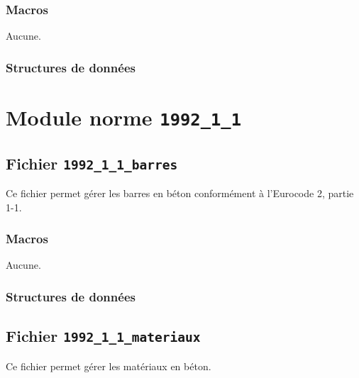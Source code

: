 \documentclass{article}
\begin{document}
\subsubsection{Macros}
Aucune.
\subsubsection{Structures de données}











\section{Module norme {\texttt{1992\_1\_1}}}
\subsection{Fichier {\texttt{1992\_1\_1\_barres}}}
Ce fichier permet gérer les barres en béton conformément à l'Eurocode 2, partie 1-1.
\subsubsection{Macros}
Aucune.
\subsubsection{Structures de données}













\subsection{Fichier {\texttt{1992\_1\_1\_materiaux}}}
Ce fichier permet gérer les matériaux en béton.
\end{document}
